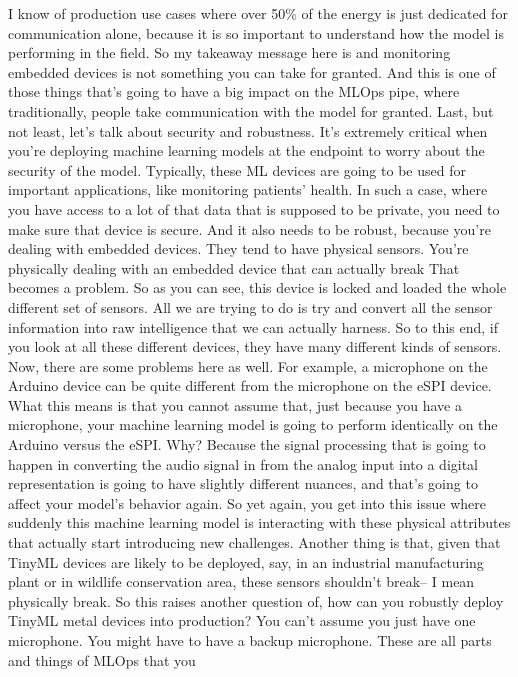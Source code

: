 I know of production use cases where over 50\% of the energy
is just dedicated for communication alone,
because it is so important to understand how
the model is performing in the field.
So my takeaway message here is and monitoring embedded devices is not
something you can take for granted.
And this is one of those things that's going to have a big impact on the MLOps
pipe, where traditionally, people take communication
with the model for granted.
Last, but not least, let's talk about security and robustness.
It's extremely critical when you're deploying machine learning
models at the endpoint to worry about the security of the model.
Typically, these ML devices are going to be used for important applications,
like monitoring patients' health.
In such a case, where you have access to a lot of that data that
is supposed to be private, you need to make sure that device is secure.
And it also needs to be robust, because you're dealing with embedded devices.
They tend to have physical sensors.
You're physically dealing with an embedded device that can actually
break That becomes a problem.
So as you can see, this device is locked and loaded
the whole different set of sensors.
All we are trying to do is try and convert all the sensor information
into raw intelligence that we can actually harness.
So to this end, if you look at all these different devices,
they have many different kinds of sensors.
Now, there are some problems here as well.
For example, a microphone on the Arduino device
can be quite different from the microphone on the eSPI device.
What this means is that you cannot assume that,
just because you have a microphone, your machine learning model is going
to perform identically on the Arduino versus the eSPI.
Why?
Because the signal processing that is going
to happen in converting the audio signal in from the analog input
into a digital representation is going to have slightly different nuances,
and that's going to affect your model's behavior again.
So yet again, you get into this issue where suddenly this machine learning
model is interacting with these physical attributes that actually
start introducing new challenges.
Another thing is that, given that TinyML devices are
likely to be deployed, say, in an industrial manufacturing plant
or in wildlife conservation area, these sensors shouldn't break--
I mean physically break.
So this raises another question of, how can you robustly deploy TinyML metal
devices into production?
You can't assume you just have one microphone.
You might have to have a backup microphone.
These are all parts and things of MLOps that you
